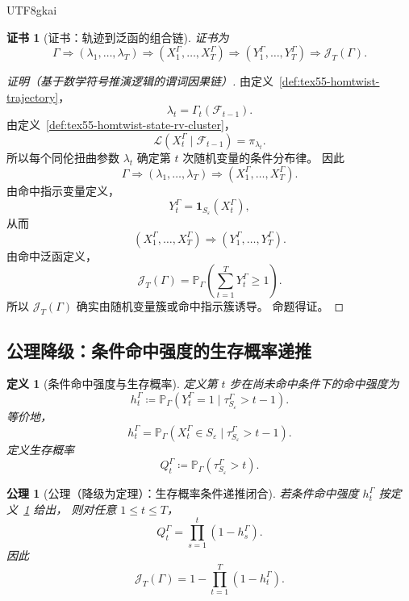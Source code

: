 \documentclass[12pt]{article}
\newtheorem{definition}{定义}[section]
\newtheorem{axiom}{公理}[section]
\newtheorem{Certificate}{证书}[section]
\newcommand{\DefEq}{\coloneqq}
\begin{document}
\begin{CJK*}{UTF8}{gkai}
\begin{Certificate}[证书：轨迹到泛函的组合链]
\label{cert:tex55-homtwist-induces-functional}
证书为
\[
  \Gamma
  \Longrightarrow
  (\lambda_1,\ldots,\lambda_T)
  \Longrightarrow
  (X_1^\Gamma,\ldots,X_T^\Gamma)
  \Longrightarrow
  (Y_1^\Gamma,\ldots,Y_T^\Gamma)
  \Longrightarrow
  \mathcal J_T(\Gamma).
\]
\end{Certificate}

\begin{proof}[证明（基于数学符号推演逻辑的谓词因果链）]
由定义~\ref{def:tex55-homtwist-trajectory}，
\[
  \lambda_t=\Gamma_t(\mathcal F_{t-1}).
\]
由定义~\ref{def:tex55-homtwist-state-rv-cluster}，
\[
  \mathcal L(X_t^\Gamma\mid\mathcal F_{t-1})=\pi_{\lambda_t}.
\]
所以每个同伦扭曲参数 \(\lambda_t\) 确定第 \(t\) 次随机变量的条件分布律。
因此
\[
  \Gamma
  \Longrightarrow
  (\lambda_1,\ldots,\lambda_T)
  \Longrightarrow
  (X_1^\Gamma,\ldots,X_T^\Gamma).
\]
由命中指示变量定义，
\[
  Y_t^\Gamma=\mathbf 1_{S_\varepsilon}(X_t^\Gamma),
\]
从而
\[
  (X_1^\Gamma,\ldots,X_T^\Gamma)
  \Longrightarrow
  (Y_1^\Gamma,\ldots,Y_T^\Gamma).
\]
由命中泛函定义，
\[
  \mathcal J_T(\Gamma)
  =
  \mathbb P_\Gamma
  \left(
  \sum_{t=1}^{T}Y_t^\Gamma\ge1
  \right).
\]
所以 \(\mathcal J_T(\Gamma)\) 确实由随机变量簇或命中指示簇诱导。
命题得证。
\end{proof}

\subsection{公理降级：条件命中强度的生存概率递推}
\label{subsec:tex55-homtwist-induction}

\begin{definition}[条件命中强度与生存概率]
\label{def:tex55-homtwist-conditional-intensity}
定义第 \(t\) 步在尚未命中条件下的命中强度为
\[
  h_t^\Gamma
  \DefEq
  \mathbb P_\Gamma
  (
  Y_t^\Gamma=1
  \mid
  \tau_{S_\varepsilon}^\Gamma>t-1
  ).
\]
等价地，
\[
  h_t^\Gamma
  =
  \mathbb P_\Gamma
  (
  X_t^\Gamma\in S_\varepsilon
  \mid
  \tau_{S_\varepsilon}^\Gamma>t-1
  ).
\]
定义生存概率
\[
  Q_t^\Gamma
  \DefEq
  \mathbb P_\Gamma(\tau_{S_\varepsilon}^\Gamma>t).
\]
\end{definition}

\begin{axiom}[公理（降级为定理）：生存概率条件递推闭合]
\label{ax:tex55-homtwist-survival-recursion}
若条件命中强度 \(h_t^\Gamma\) 按定义~\ref{def:tex55-homtwist-conditional-intensity} 给出，
则对任意 \(1\le t\le T\)，
\[
  Q_t^\Gamma
  =
  \prod_{s=1}^{t}(1-h_s^\Gamma).
\]
因此
\[
  \mathcal J_T(\Gamma)
  =
  1-
  \prod_{t=1}^{T}(1-h_t^\Gamma).
\]
\end{axiom}


\end{CJK*}
\end{document}
